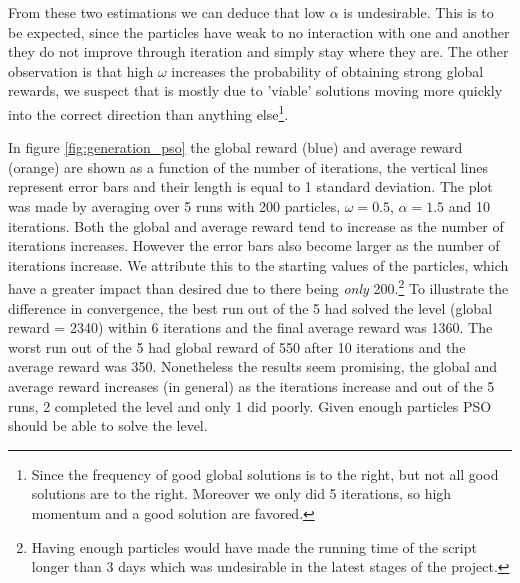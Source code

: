 \documentclass[]{article}
\begin{document}
From these two estimations we can deduce that low $\alpha$ is undesirable. This is to be expected, since the particles have weak to no interaction with one and another they do not improve through iteration and simply stay where they are. The other observation is that high $\omega$ increases the probability of obtaining strong global rewards, we suspect that is mostly due to 'viable' solutions moving more quickly into the correct direction than anything else\footnote{Since the frequency of good global solutions is to the right, but not all good solutions are to the right. Moreover we only did 5 iterations, so high momentum and a good solution are favored.}.\bigskip

In figure \ref{fig:generation_pso} the global reward (blue) and average reward (orange) are shown as a function of the number of iterations, the vertical lines represent error bars and their length is equal to 1 standard deviation. The plot was made by averaging over 5 runs with 200 particles, $\omega =0.5$, $\alpha =1.5$ and 10 iterations. Both the global and average reward tend to increase as the number of iterations increases. However the error bars also become larger as the number of iterations increase. We attribute this to the starting values of the particles, which have a greater impact than desired due to there being \textit{only} 200.\footnote{Having enough particles would have made the running time of the script longer than 3 days which was undesirable in the latest stages of the project.} To illustrate the difference in convergence, the best run out of the 5 had solved the level (global reward = 2340) within 6 iterations and the final average reward was 1360. The worst run out of the 5 had global reward of 550 after 10 iterations and the average reward was 350. Nonetheless the results seem promising, the global and average reward increases (in general) as the iterations increase and out of the 5 runs, 2 completed the level and only 1 did poorly. Given enough particles PSO should be able to solve the level.
\end{document}
